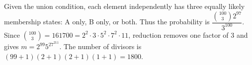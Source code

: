 Given the union condition, each element independently has three equally likely membership states: A only, B only, or both. Thus the probability is $\dfrac{\binom{100}{3}2^{97}}{3^{100}}$. Since $\binom{100}{3}=161700=2^2\cdot3\cdot5^2\cdot7^2\cdot11$, reduction removes one factor of $3$ and gives $m=2^{99}5^27^211$. The number of divisors is $(99+1)(2+1)(2+1)(1+1)=\boxed{1800}$.
